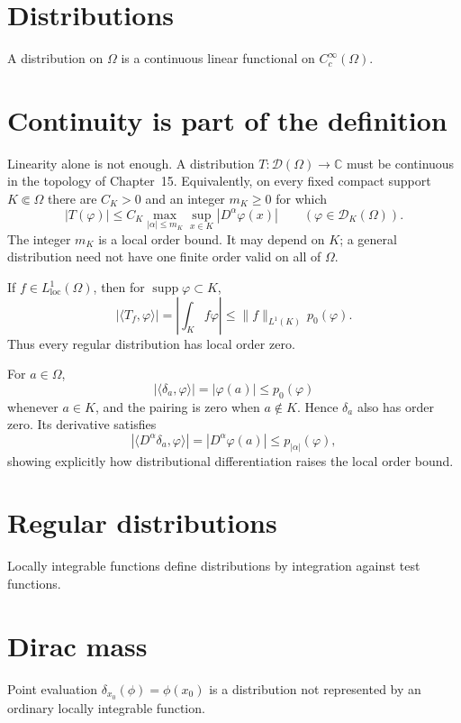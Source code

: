 \section{Distributions}
A distribution on $\Omega$ is a continuous linear functional on $C_c^\infty(\Omega)$.

\section{Continuity is part of the definition}
Linearity alone is not enough. A distribution
\(T:\mathcal D(\Omega)\to\mathbb C\) must be continuous in the topology of
Chapter~15. Equivalently, on every fixed compact support \(K\Subset\Omega\)
there are \(C_K>0\) and an integer \(m_K\ge0\) for which
\[
\boxed{
|T(\varphi)|
\le C_K
\max_{|\alpha|\le m_K}
\sup_{x\in K}|D^\alpha\varphi(x)|
}
\qquad
(\varphi\in\mathcal D_K(\Omega)).
\]
The integer \(m_K\) is a local order bound. It may depend on \(K\); a general
distribution need not have one finite order valid on all of \(\Omega\).

\begin{example}
If \(f\in L^1_{\mathrm{loc}}(\Omega)\), then for
\(\operatorname{supp}\varphi\subset K\),
\[
|\langle T_f,\varphi\rangle|
=
\left|\int_K f\varphi\right|
\le
\|f\|_{L^1(K)}\,p_0(\varphi).
\]
Thus every regular distribution has local order zero.

For \(a\in\Omega\),
\[
|\langle\delta_a,\varphi\rangle|
=|\varphi(a)|\le p_0(\varphi)
\]
whenever \(a\in K\), and the pairing is zero when \(a\notin K\). Hence
\(\delta_a\) also has order zero. Its derivative satisfies
\[
|\langle D^\alpha\delta_a,\varphi\rangle|
=
|D^\alpha\varphi(a)|
\le p_{|\alpha|}(\varphi),
\]
showing explicitly how distributional differentiation raises the local order
bound.
\end{example}

\section{Regular distributions}
Locally integrable functions define distributions by integration against test functions.

\section{Dirac mass}
Point evaluation $\delta_{x_0}(\phi)=\phi(x_0)$ is a distribution not represented by an ordinary locally integrable function.


